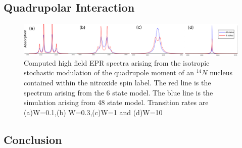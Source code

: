 \subsection{Quadrupolar Interaction}
\begin{figure}[h!]
\centering
\includegraphics[width=1\textwidth]{figures/chap2/2site_final.png}
\caption{Computed high field EPR spectra arising from the isotropic stochastic modulation of the quadrupole moment of an $^{14}N$ nucleus contained within the nitroxide spin label. The red line is the spectrum arising from the 6 state model. The blue line is the simulation arising from 48 state model. Transition rates are (a)W=0.1,(b) W=0.3,(c)W=1 and (d)W=10}
\label{figure:spin05der2}
\end{figure}
\subsection{Conclusion}
\clearpage